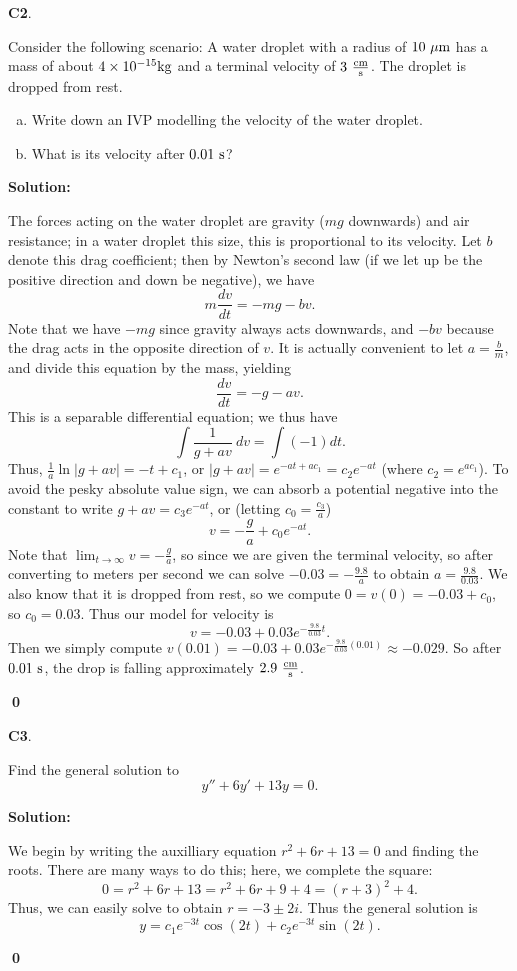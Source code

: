 \documentclass{article}
\newenvironment{problem}[1]
{
  \begin{flushleft}
  \textbf{#1}.
  \ignorespaces
}
{
  \end{flushleft}
}
\newenvironment{solution}
{
  \ignorespaces
  \textbf{Solution:}
}
{
  \ignorespacesafterend
  \begin{flushright}
  {\bfseries \qed}
  \end{flushright}
}
\begin{document}
\begin{problem}{C2}
Consider the following scenario: 
A water droplet with a radius of \(10\ {\rm \mu m}\) has a mass of about \(4 \times 10^{-15} {\rm kg}\) and a terminal velocity of \(3\ {\rm \frac{cm}{s}}\).  The droplet is dropped from rest.  
\begin{enumerate}[(a)]
\item Write down an IVP modelling the velocity of the water droplet.
\item What is its velocity after \(0.01\ {\rm s}\)?
\end{enumerate}
\end{problem}
\begin{solution}
The forces acting on the water droplet are gravity (\(mg\) downwards) and air resistance; in a water droplet this size, this is proportional to its velocity.  Let \(b\) denote this drag coefficient; then by Newton's second law (if we let up be the positive direction and down be negative), we have
\[ m \frac{dv}{dt} = -mg - bv .\]
Note that we have \(-mg\) since gravity always acts downwards, and \(-bv\) because the drag acts in the opposite direction of \(v\).
It is actually convenient to let \(a=\frac{b}{m}\), and divide this equation by the mass, yielding 
\[ \frac{dv}{dt} = -g - av .\]
This is a separable differential equation; we thus have
\[ \int \frac{1}{g+av}\ dv = \int (-1)dt .\]
Thus, \(\frac{1}{a}\ln|g+av| = -t+c_1\), or \(|g+av| = e^{-at+ac_1}=c_2e^{-at}\) (where \(c_2=e^{ac_1}\)).  To avoid the pesky absolute value sign, we can absorb a potential negative into the constant to write \(g+av=c_3 e^{-at}\), or (letting \(c_0=\frac{c_3}{a}\))
\[ v=-\frac{g}{a} +c_0 e^{-at}.\]
Note that \(\lim _{t \rightarrow \infty} v = -\frac{g}{a}\), so since we are given the terminal velocity, so after converting to meters per second we can solve \(-0.03 = -\frac{9.8}{a}\) to obtain \(a=\frac{9.8}{0.03}\).  We also know that it is dropped from rest, so we compute \(0=v(0)=-0.03+c_0\), so \(c_0=0.03\).  Thus our model for velocity is 
\[ v=-0.03+0.03e^{-\frac{9.8}{0.03} t}.\]
Then we simply compute \(v(0.01)=-0.03+0.03e^{-\frac{9.8}{0.03} (0.01)} \approx -0.029 \).  So after \(0.01\ {\rm s}\), the drop is falling approximately  \(2.9\ {\rm \frac{cm}{s}}\).
\end{solution}


\begin{problem}{C3}
Find the general solution to \[y''+6y'+13y=0.\]
\end{problem}
\begin{solution}
We begin by writing the auxilliary equation \(r^2+6r+13=0\) and finding the roots.  There are many ways to do this; here, we complete  the square:
\[0=r^2+6r+13=r^2+6r+9+4=(r+3)^2+4.\]
Thus, we can easily solve to obtain \(r=-3\pm2i\).  Thus the general solution is
\[ y= c_1 e^{-3t} \cos(2t) + c_2 e^{-3t} \sin(2t) .\]
\end{solution}
\end{document}
